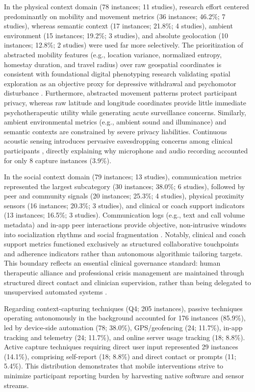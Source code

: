 In the physical context domain (78 instances; 11 studies), research effort centered predominantly on mobility and movement metrics (36 instances; 46.2\%; 7 studies), whereas semantic context (17 instances; 21.8\%; 4 studies), ambient environment (15 instances; 19.2\%; 3 studies), and absolute geolocation (10 instances; 12.8\%; 2 studies) were used far more selectively. The prioritization of abstracted mobility features (e.g., location variance, normalized entropy, homestay duration, and travel radius) over raw geospatial coordinates is consistent with foundational digital phenotyping research validating spatial exploration as an objective proxy for depressive withdrawal and psychomotor disturbance \cite{saeb2015mobilephone, onnela2016digitalphenotyping, shen2025passive}. Furthermore, abstracted movement patterns protect participant privacy, whereas raw latitude and longitude coordinates provide little immediate psychotherapeutic utility while generating acute surveillance concerns. Similarly, ambient environmental metrics (e.g., ambient sound and illuminance) and semantic contexts are constrained by severe privacy liabilities. Continuous acoustic sensing introduces pervasive eavesdropping concerns among clinical participants \cite{martinezmartin2021ethical, sheikh2021passivesensing}, directly explaining why microphone and audio recording accounted for only 8 capture instances (3.9\%).

In the social context domain (79 instances; 13 studies), communication metrics represented the largest subcategory (30 instances; 38.0\%; 6 studies), followed by peer and community signals (20 instances; 25.3\%; 4 studies), physical proximity sensors (16 instances; 20.3\%; 3 studies), and clinical or coach support indicators (13 instances; 16.5\%; 3 studies). Communication logs (e.g., text and call volume metadata) and in-app peer interactions provide objective, non-intrusive windows into socialization rhythms and social fragmentation \cite{langener2023capturing}. Notably, clinical and coach support metrics functioned exclusively as structured collaborative touchpoints and adherence indicators rather than autonomous algorithmic tailoring targets. This boundary reflects an essential clinical governance standard: human therapeutic alliance and professional crisis management are maintained through structured direct contact and clinician supervision, rather than being delegated to unsupervised automated systems \cite{rogan2024health, adler2024actionablesensing}.

Regarding context-capturing techniques (Q4; 205 instances), passive techniques operating autonomously in the background accounted for 176 instances (85.9\%), led by device-side automation (78; 38.0\%), GPS/geofencing (24; 11.7\%), in-app tracking and telemetry (24; 11.7\%), and online server usage tracking (18; 8.8\%). Active capture techniques requiring direct user input represented 29 instances (14.1\%), comprising self-report (18; 8.8\%) and direct contact or prompts (11; 5.4\%). This distribution demonstrates that mobile interventions strive to minimize participant reporting burden by harvesting native software and sensor streams. 


